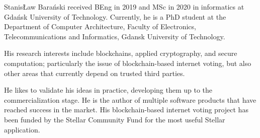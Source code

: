 \documentclass{ieeeaccess}
\begin{document}
\begin{IEEEbiography}{Stanis\L{}aw Bara{\'n}ski} received BEng in 2019 and MSc in 2020 in informatics at Gdańsk University of Technology. 
Currently, he is a PhD student at the Department of Computer Architecture, Faculty of Electronics, Telecommunications and Informatics, Gdansk University of Technology.

His research interests include blockchains, applied cryptography, and secure computation; particularly the issue of blockchain-based internet voting, but also other areas that currently depend on trusted third parties.

He likes to validate his ideas in practice, developing them up to the commercialization stage. He is the author of multiple software products that have reached success in the market. His blockchain-based internet voting project has been funded by the Stellar Community Fund for the most useful Stellar application.
\end{IEEEbiography}
\end{document}
